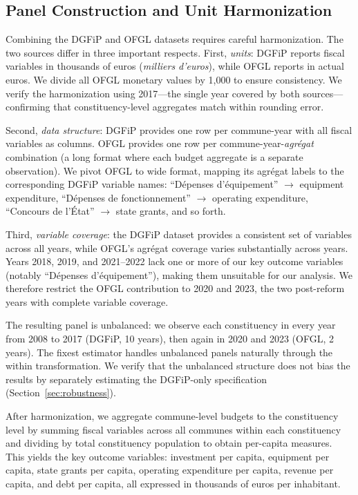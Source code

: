 \documentclass[12pt]{article}
\begin{document}
\subsection{Panel Construction and Unit Harmonization}

Combining the DGFiP and OFGL datasets requires careful harmonization. The two sources differ in three important respects. First, \textit{units}: DGFiP reports fiscal variables in thousands of euros (\textit{milliers d'euros}), while OFGL reports in actual euros. We divide all OFGL monetary values by 1,000 to ensure consistency. We verify the harmonization using 2017---the single year covered by both sources---confirming that constituency-level aggregates match within rounding error.

Second, \textit{data structure}: DGFiP provides one row per commune-year with all fiscal variables as columns. OFGL provides one row per commune-year-\textit{agrégat} combination (a long format where each budget aggregate is a separate observation). We pivot OFGL to wide format, mapping its agrégat labels to the corresponding DGFiP variable names: ``Dépenses d'équipement'' $\rightarrow$ equipment expenditure, ``Dépenses de fonctionnement'' $\rightarrow$ operating expenditure, ``Concours de l'État'' $\rightarrow$ state grants, and so forth.

Third, \textit{variable coverage}: the DGFiP dataset provides a consistent set of variables across all years, while OFGL's agrégat coverage varies substantially across years. Years 2018, 2019, and 2021--2022 lack one or more of our key outcome variables (notably ``Dépenses d'équipement''), making them unsuitable for our analysis. We therefore restrict the OFGL contribution to 2020 and 2023, the two post-reform years with complete variable coverage.

The resulting panel is unbalanced: we observe each constituency in every year from 2008 to 2017 (DGFiP, 10 years), then again in 2020 and 2023 (OFGL, 2 years). The fixest estimator handles unbalanced panels naturally through the within transformation. We verify that the unbalanced structure does not bias the results by separately estimating the DGFiP-only specification (Section~\ref{sec:robustness}).

After harmonization, we aggregate commune-level budgets to the constituency level by summing fiscal variables across all communes within each constituency and dividing by total constituency population to obtain per-capita measures. This yields the key outcome variables: investment per capita, equipment per capita, state grants per capita, operating expenditure per capita, revenue per capita, and debt per capita, all expressed in thousands of euros per inhabitant.
\end{document}
